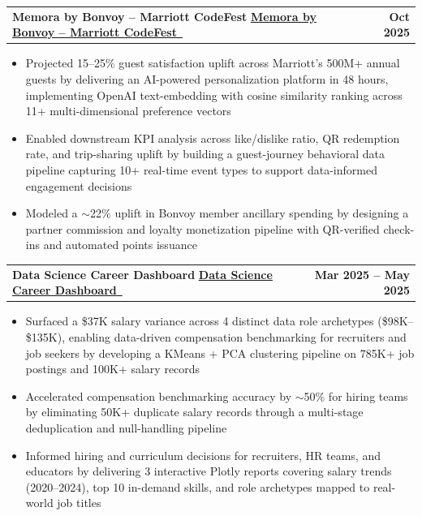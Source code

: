\documentclass[letterpaper,11pt]{article}
\makeatletter
\newcommand{\resumeItem}[1]{
  \item\small{{#1 \vspace{-2pt}}}
}
\newcommand{\resumeProjectHeading}[4]{%
  \vspace{-2pt}\item
  \begin{tabular*}{1.001\textwidth}{l@{\extracolsep{\fill}}r}
    \small{%
      \ifthenelse{\equal{#1}{}}%
        {%
          \textbf{#2}%
          \ifthenelse{\equal{#3}{}}{}{ $|$ \emph{#3}}%
        }%
        {%
          \href{#1}{\underline{\textbf{#2}}~\faLink}%
          \ifthenelse{\equal{#3}{}}{}{ $|$ \emph{#3}}%
        }%
    } & \textbf{\small #4} \\
  \end{tabular*}\vspace{-7pt}
}
\newcommand{\resumeItemListStart}{\begin{itemize}}
\newcommand{\resumeItemListEnd}{\end{itemize}\vspace{-5pt}}
\makeatother
\begin{document}
        \resumeProjectHeading
            {https://memora-by-bonvoy.vercel.app/}
            {Memora by Bonvoy -- Marriott CodeFest}
            {React.js + Vite, TypeScript, Tailwind CSS, PostgreSQL}
            {Oct 2025}
            \resumeItemListStart
                \resumeItem{Projected 15--25\% guest satisfaction uplift across Marriott's 500M+ annual guests by delivering an AI-powered personalization platform in 48 hours, implementing OpenAI text-embedding with cosine similarity ranking across 11+ multi-dimensional preference vectors}
                \resumeItem{Enabled downstream KPI analysis across like/dislike ratio, QR redemption rate, and trip-sharing uplift by building a guest-journey behavioral data pipeline capturing 10+ real-time event types to support data-informed engagement decisions}
                \resumeItem{Modeled a ${\sim}$22\% uplift in Bonvoy member ancillary spending by designing a partner commission and loyalty monetization pipeline with QR-verified check-ins and automated points issuance}
            \resumeItemListEnd
        \vspace{-10pt}

        \resumeProjectHeading
            {https://www.github.com/lakshya46jain/data_career_dashboard/}
            {Data Science Career Dashboard}
            {Python (Pandas, Matplotlib, NumPy, Scikit-Learn), Jupyter}
            {Mar 2025 -- May 2025}
            \resumeItemListStart
                \resumeItem{Surfaced a \$37K salary variance across 4 distinct data role archetypes (\$98K--\$135K), enabling data-driven compensation benchmarking for recruiters and job seekers by developing a KMeans + PCA clustering pipeline on 785K+ job postings and 100K+ salary records}
                \resumeItem{Accelerated compensation benchmarking accuracy by ${\sim}$50\% for hiring teams by eliminating 50K+ duplicate salary records through a multi-stage deduplication and null-handling pipeline}
                \resumeItem{Informed hiring and curriculum decisions for recruiters, HR teams, and educators by delivering 3 interactive Plotly reports covering salary trends (2020--2024), top 10 in-demand skills, and role archetypes mapped to real-world job titles}
            \resumeItemListEnd
        \vspace{-10pt}
\end{document}

